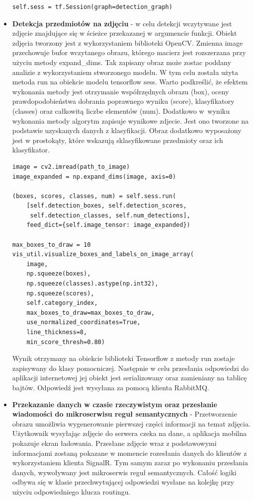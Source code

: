 \begin{itemize}
\begin{lstlisting}[caption={Fragment inicjalizacji obiektów biblioteki Tensorflow.}]
	self.sess = tf.Session(graph=detection_graph)
\end{lstlisting}
\item \textbf{Detekcja przedmiotów na zdjęciu} - w celu detekcji wczytywane jest zdjęcie znajdujące się w ścieżce przekazanej w argumencie funkcji. Obiekt zdjęcia tworzony jest z wykorzystaniem biblioteki OpenCV. Zmienna image przechowuje bufor wczytanego obrazu, którego macierz jest rozszerzana przy użyciu metody expand\_dims. Tak zapisany obraz może zostac poddany analizie z wykorzystaniem stworzonego modelu. W tym celu została użyta metoda run na obiekcie modelu tensorflow sess. Warto podkreślić, że efektem wykonania metody jest otrzymanie współrzędnych obrazu (box), oceny prawdopodobieństwa dobrania poprawnego wyniku (score), klasyfikatory (classes) oraz całkowitą liczbe elementów (num). Dodatkowo w~wyniku wykonania metody algorytm zapisuje wynikowe zdjecie. Jest ono tworzone na podstawie uzyskanych danych z klasyfikacji. Obraz dodatkowo wyposażony jest w prostokąty, które wskazują sklasyfikowane przedmioty oraz ich klasyfikator.
\newline

\begin{lstlisting}[caption={Detekcja przedmiotów na obrazie.}]
image = cv2.imread(path_to_image)
image_expanded = np.expand_dims(image, axis=0)

(boxes, scores, classes, num) = self.sess.run(
	[self.detection_boxes, self.detection_scores,
	 self.detection_classes, self.num_detections],
	feed_dict={self.image_tensor: image_expanded})

max_boxes_to_draw = 10
vis_util.visualize_boxes_and_labels_on_image_array(
	image,
	np.squeeze(boxes),
	np.squeeze(classes).astype(np.int32),
	np.squeeze(scores),
	self.category_index,
	max_boxes_to_draw=max_boxes_to_draw,
	use_normalized_coordinates=True,
	line_thickness=8,
	min_score_thresh=0.80)
\end{lstlisting}

Wynik otrzymany na obiekcie biblioteki Tensorflow z metody run zostaje zapisywany do klasy pomocniczej. Następnie w celu przesłania odpowiedzi do aplikacji internetowej jej obiekt jest serializowany oraz zamieniany na tablicę bajtów. Odpowiedź jest wysyłana za pomocą klienta RabbitMQ.
\newline

\item \textbf{Przekazanie danych w czasie rzeczywistym oraz przesłanie wiadomości do mikroserwisu reguł semantycznych} - Przetworzenie obrazu umożliwia wygenerowanie pierwszej części informacji na temat zdjęcia. Użytkownik wysyłając zdjęcie do serwera czeka na dane, a aplikacja mobilna pokazuje ekran ładowania. Przesłane zdjęcie wraz z podstawowymi informacjami zostaną pokazane w momencie rozesłania danych do klientów z wykorzystaniem klienta SignalR. Tym samym zaraz po wykonaniu przesłania danych, wywoływany jest mikroserwis reguł semantycznych. Całość logiki odbywa się w klasie przechwytującej odpowiedzi wysłane na kolejkę przy użyciu odpowiedniego klucza routingu.


\end{itemize}
